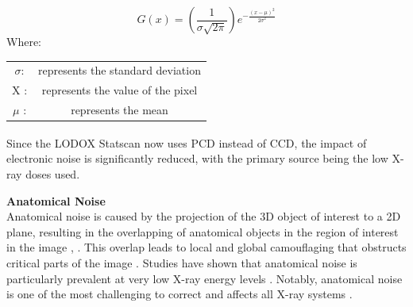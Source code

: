 \begin{equation}
G(x) = \left( \frac{1}{\sigma \sqrt{2\pi}} \right) e^{-\frac{(x - \mu)^2}{2\sigma^2}}
\label{eq:gaussian}
\end{equation}
Where:
\begin{table}[h!]
    \begin{tabular}{cc}
         $\sigma$:& represents the standard deviation \\
         X :& represents the value of the pixel \\
         $\mu$ :& represents the mean \\
    \end{tabular}
    
\end{table}

Since the LODOX\textsuperscript{\textregistered} Statscan\textsuperscript{\textregistered} now uses \gls{PCD} instead of \gls{CCD}, the impact of electronic noise is significantly reduced, with the primary source being the low X-ray doses used.


\textbf{Anatomical Noise} \\
Anatomical noise is caused by the projection of the 3D object of interest to a 2D plane, resulting in the overlapping of anatomical objects in the region of interest in the image \cite{veldkamp_dose_2009}, \cite{seibert_tradeoffs_2004}. This overlap leads to local and global camouflaging that obstructs critical parts of the image \cite{seibert_tradeoffs_2004}
. Studies have shown that anatomical noise is particularly prevalent at very low X-ray energy levels \cite{veldkamp_dose_2009}. Notably, anatomical noise is one of the most challenging to correct and affects all X-ray systems \cite{seibert_tradeoffs_2004}.

